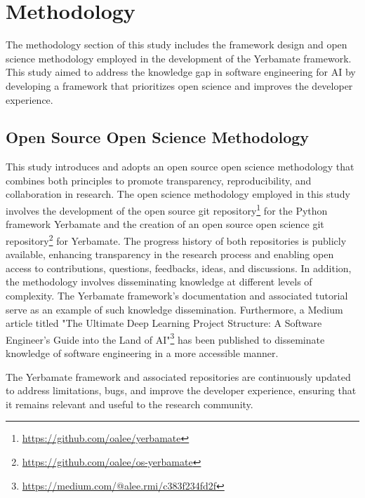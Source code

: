 


\section{Methodology}

The methodology section of this study includes the framework design and open science methodology employed in the development of the Yerbamate framework.
This study aimed to address the knowledge gap in software engineering for AI by developing a framework that prioritizes open science and improves the developer experience. 

\subsection{Open Source Open Science Methodology}

This study introduces and adopts an open source open science methodology that combines both principles to promote transparency, reproducibility, and collaboration in research. The open science methodology employed in this study involves the development of the open source git repository\footnote{\url{https://github.com/oalee/yerbamate}} for the Python framework Yerbamate and the creation of an open source open science git repository\footnote{\url{https://github.com/oalee/os-yerbamate}} for Yerbamate. The progress history of both repositories is publicly available, enhancing transparency in the research process and enabling open access to contributions, questions, feedbacks, ideas, and discussions.
In addition, the methodology involves disseminating knowledge at different levels of complexity. The Yerbamate framework's documentation and associated tutorial serve as an example of such knowledge dissemination. Furthermore, a Medium article titled "The Ultimate Deep Learning Project Structure: A Software Engineer’s Guide into the Land of AI"\footnote{\url{https://medium.com/@alee.rmi/c383f234fd2f}} has been published to disseminate knowledge of software engineering in a more accessible manner.

The Yerbamate framework and associated repositories are continuously updated to address limitations, bugs, and improve the developer experience, ensuring that it remains relevant and useful to the research community. 

